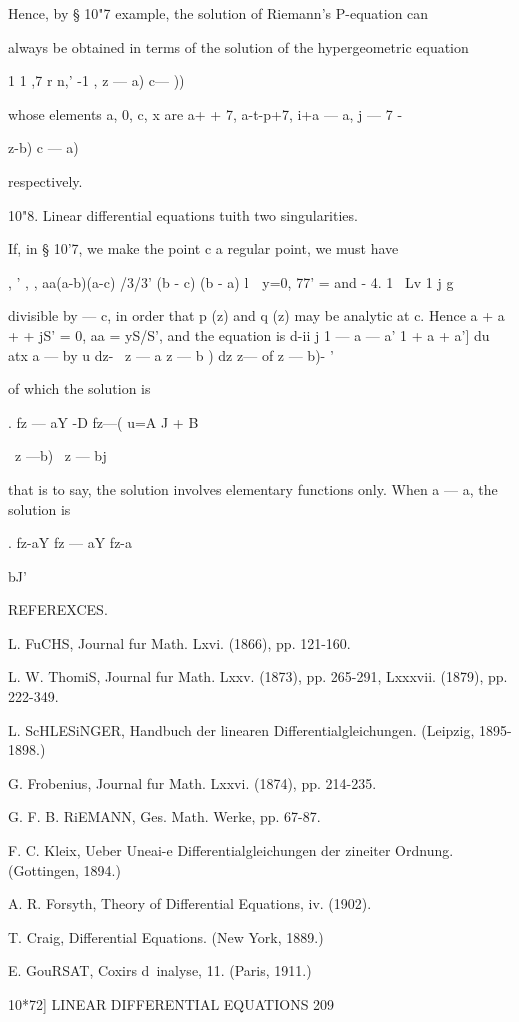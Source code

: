 Hence, by § 10"7 example, the solution of Riemann's P-equation can

always be obtained in terms of the solution of the hypergeometric
equation

1 1 ,7 r n,' -1 , z — a) c— ))

whose elements a, 0, c, x are a+ + 7, a-t-p+7, i+a — a, j — 7 -

 z-b) c — a)

respectively.

10"8. Linear differential equations tuith two singularities.

If, in § 10'7, we make the point c a regular point, we must have

, ' , , aa(a-b)(a-c) /3/3' (b - c) (b - a) l\ \ y=0, 77' = and - 4. 1
\ Lv 1 j g

divisible by — c, in order that p (z) and q (z) may be analytic at c.
Hence a + a + + jS' = 0, aa = yS/S', and the equation is d-ii j 1 — a
— a' 1 + a + a'] du atx a — by u dz- \ z — a z — b ) dz z— of z — b)-
'

of which the solution is

. fz — aY -D fz—( u=A J + B

\ z —b) \ z — bj

that is to say, the solution involves elementary functions only. When
a — a, the solution is

. fz-aY fz — aY fz-a

bJ'

REFEREXCES.

L. FuCHS, Journal fur Math. Lxvi. (1866), pp. 121-160.

L. W. ThomiS, Journal fur Math. Lxxv. (1873), pp. 265-291, Lxxxvii.
(1879), pp. 222-349.

L. ScHLESiNGER, Handbuch der linearen Differentialgleichungen.
(Leipzig, 1895-1898.)

G. Frobenius, Journal fur Math. Lxxvi. (1874), pp. 214-235.

G. F. B. RiEMANN, Ges. Math. Werke, pp. 67-87.

F. C. Kleix, Ueber Uneai-e Differentialgleichungen der zineiter
Ordnung. (Gottingen, 1894.)

A. R. Forsyth, Theory of Differential Equations, iv. (1902).

T. Craig, Differential Equations. (New York, 1889.)

E. GouRSAT, Coxirs d\ inalyse, 11. (Paris, 1911.)

10*72] LINEAR DIFFERENTIAL EQUATIONS 209

